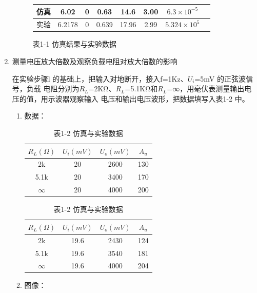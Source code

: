 \documentclass[a4paper,10pt,notitlepage]{article}
\begin{document}
\begin{enumerate}
\begin{figure}[h]
\begin{minipage}{0.28\textwidth}
\begin{tabular}{|c|c|c|c|c|c|c|c|}
						\hline
						仿真 & 6.02 & 0 & 0.63 & 14.6 & 3.00 & $6.3 \times 10^{-5}$ \\
						\hline
						实验 & 6.2178 & 0 & 0.639 & 17.96 & 2.99 & $5.324 \times 10^{5}$ \\
						\hline
					\end{tabular}
					\caption*{表1-1 仿真结果与实验数据}
				\end{minipage}
			\end{figure}
			\newpage
			\item 测量电压放大倍数及观察负载电阻对放大倍数的影响\par
			在实验步骤l 的基础上，把输入对地断开，接入f=1Kz、$U_i$=5mV 的正弦波信号，负载
			电阻分别为$R_L$=2KΩ、$R_L$=5.1KΩ和$R_L$=∞，用毫伏表测量输出电压的值，用示波器观察输入
			电压和输出电压波形，把数据填写入表1-2 中。
			\begin{enumerate}
				\item 数据：
				\begin{table}[h]
					\centering
					\begin{minipage}{0.3\textwidth}
						\centering
						\caption*{表1-2-1 仿真数据}
						\begin{tabular}{|c|c|c|c|}
							\hline
							$R_L(\Omega)$ & $U_i(mV)$ & $U_o(mV)$ & $A_u$ \\
							\hline
							2k & 20 & 2600 & 130 \\
							\hline
							5.1k & 20 & 3400 & 170 \\
							\hline
							$\infty$ & 20 & 4000 & 200 \\
							\hline
						\end{tabular}
					\end{minipage}
					\qquad
					\begin{minipage}{0.3\textwidth}
						\centering
						\caption*{表1-2-2 实验数据}
						\begin{tabular}{|c|c|c|c|}
							\hline
							$R_L(\Omega)$ & $U_i(mV)$ & $U_o(mV)$ & $A_u$ \\
							\hline
							2k & 19.6 & 2430 & 124 \\
							\hline
							5.1k & 19.6 & 3540 & 181 \\
							\hline
							$\infty$ & 19.6 & 4000 & 204 \\
							\hline
						\end{tabular}						
					\end{minipage}
					\caption*{表1-2 仿真与实验数据}
				\end{table}
				\item 图像：
				\begin{table}[h]
				\centering
				\begin{tabular}{|c|c|c|}
	

\end{tabular}
\end{table}
\end{enumerate}
\end{enumerate}
\end{document}
